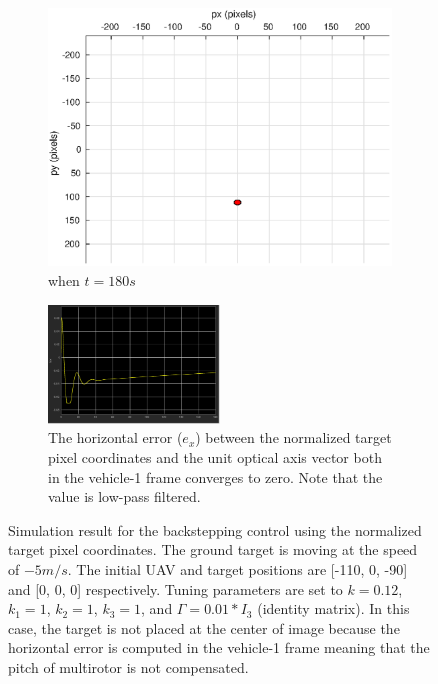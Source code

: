 \begin{figure}
\begin{subfigure}[b]{0.32\linewidth}
		\includegraphics[width=\textwidth]{images/chapter4/image_camera_-5mps_180s}
		\caption{when $t=180s$}
	\end{subfigure}	
	\begin{subfigure}[b]{0.8\linewidth}
		\centering
		\includegraphics[width=0.5\textwidth]{images/chapter4/image_Ex_-5mps}
		\caption{The horizontal error ($e_x$) between the normalized target pixel coordinates and the unit optical axis vector both in the vehicle-1 frame converges to zero. Note that the value is low-pass filtered.}
	\end{subfigure}	
	\caption{Simulation result for the backstepping control using the normalized target pixel coordinates. The ground target is moving at the speed of $-5m/s$. The initial UAV and target positions are [-110, 0, -90] and [0, 0, 0] respectively. Tuning parameters are set to $k=0.12$, $k_1=1$, $k_2=1$, $k_3=1$, and $\Gamma=0.01*I_3$ (identity matrix). In this case, the target is not placed at the center of image because the horizontal error is computed in the vehicle-1 frame meaning that the pitch of multirotor is not compensated.}
	\label{image_-5mps}
\end{figure}